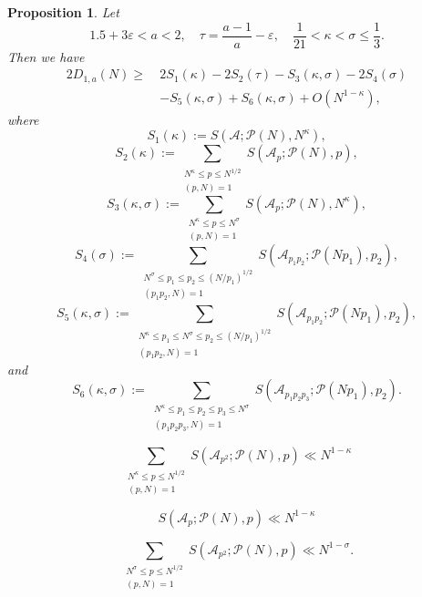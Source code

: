 \documentclass[10pt,a4paper]{amsart}
\newtheorem{proposition}{Proposition}
\def\ge{\geqslant}
\def\le{\leqslant}
\begin{document}
\begin{proposition}\label{Goldbachbig}
Let 
$$
1.5+3\varepsilon<a<2,\quad \tau=\dfrac{a-1}{a}-\varepsilon, \quad \frac{1}{21}<\kappa<\sigma\le \frac{1}{3}. 
$$ 
Then we have 
\begin{equation}\label{Goldbachbigw2}
\begin{split}
2D_{1,a}(N)
\ge\ & 2S_1(\kappa)-2S_2(\tau)-S_3(\kappa,\sigma)-2S_4(\sigma)\\
&-S_5(\kappa,\sigma)+S_6(\kappa,\sigma)+O(N^{1-\kappa}),
\end{split}
\end{equation}
where
\[
S_1(\kappa) := S(\mathscr{A}; \mathscr{P}(N), N^\kappa), 
\]
\[
S_2(\kappa) :=\sum\limits_{\substack{N^\kappa\le p\le N^{1/2} \\(p, N)=1}}S(\mathscr{A}_p ; \mathscr{P}(N), p), 
\]
\[
S_3(\kappa, \sigma) := \sum_{\substack{N^\kappa \le p \le N^\sigma \\ (p, N) = 1}} S(\mathscr{A}_p; \mathscr{P}(N), N^\kappa),
\] 
\[
S_4(\sigma) := \sum_{\substack{N^\sigma \le p_1 \le p_2 \le (N/p_1)^{1/2} \\ (p_1 p_2, N) = 1}} S(\mathscr{A}_{p_1 p_2}; \mathscr{P}(N p_1), p_2), 
\]
\[
S_5(\kappa, \sigma) := \sum_{\substack{N^\kappa \le p_1 \le N^\sigma \le p_2 \le (N/p_1)^{1/2} \\ (p_1 p_2, N) = 1}}  S(\mathscr{A}_{p_1 p_2}; \mathscr{P}(N p_1), p_2),
\]
and 
\[
S_6(\kappa, \sigma) := \sum_{\substack{N^\kappa \le p_1 \le p_2 \le p_3 \le N^\sigma \\ (p_1 p_2 p_3, N) = 1}} S(\mathscr{A}_{p_1 p_2 p_3};  \mathscr{P}(N p_1), p_2).
\]
\end{proposition}

\begin{equation}\label{Buchstab1}
\sum_{\substack{N^\kappa \le p \le N^{1/2} \\ (p, N) = 1}} S(\mathscr{A}_{p^2} ; \mathscr{P}(N), p) 
\ll N^{1-\kappa} 
\end{equation}

\begin{equation}\label{Buchstab0} 
S(\mathscr{A}_{p} ; \mathscr{P}(N), p) \ll N^{1-\kappa}
\end{equation}

		\begin{equation}\label{Buchstab2}
		\sum_{\substack{N^\sigma \le p \le N^{1/2} \\ (p, N) = 1}} S\left(\mathscr{A}_{p^2} ; \mathscr{P}(N), p\right) \ll N^{1-\sigma}.
		\end{equation}
\end{document}
